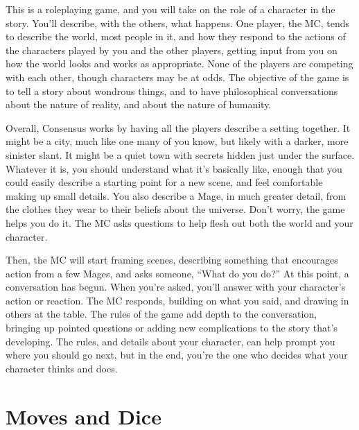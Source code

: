 \documentclass[
  oneside,
  statementpaper,
  9pt]{memoir}
\begin{document}
\begin{Player}

This is a roleplaying game, and you will take on the role of a character in the story. You'll describe, with the others, what happens. One player, the MC, tends to describe the world, most people in it, and how they respond to the actions of the characters played by you and the other players, getting input from you on how the world looks and works as appropriate. None of the players are competing with each other, though characters may be at odds. The objective of the game is to tell a story about wondrous things, and to have philosophical conversations about the nature of reality, and about the nature of humanity.

Overall, Consensus works by having all the players describe a setting together. It might be a city, much like one many of you know, but likely with a darker, more sinister slant. It might be a quiet town with secrets hidden just under the surface. Whatever it is, you should understand what it’s basically like, enough that you could easily describe a starting point for a new scene, and feel comfortable making up small details. You also describe a Mage, in much greater detail, from the clothes they wear to their beliefs about the universe. Don’t worry, the game helps you do it. The MC asks questions to help flesh out both the world and your character.

Then, the MC will start framing scenes, describing something that encourages action from a few Mages, and asks someone, “What do you do?” At this point, a conversation has begun. When you're asked, you'll answer with your character's action or reaction. The MC responds, building on what you said, and drawing in others at the table. The rules of the game add depth to the conversation, bringing up pointed questions or adding new complications to the story that’s developing. The rules, and details about your character, can help prompt you where you should go next, but in the end, you’re the one who decides what your character thinks and does.

\end{Player}

\hypertarget{moves-and-dice}{%
\section{Moves and Dice}\label{moves-and-dice}}
\end{document}
